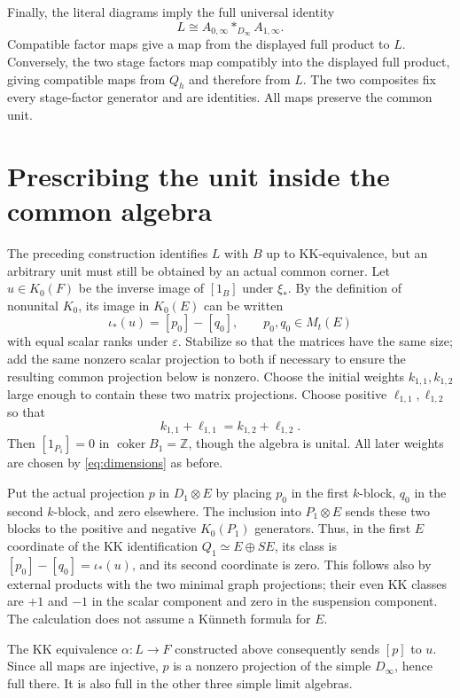 \documentclass[11pt]{article}
\theoremstyle{remark}\newtheorem{remark}[theorem]{Remark}
\newcommand{\Z}{\mathbb Z}\newcommand{\C}{\mathbb C}
\newcommand{\coker}{\operatorname{coker}}\newcommand{\rank}{\operatorname{rank}}
\begin{document}
Finally, the literal diagrams imply the full universal identity
\begin{equation}\label{eq:fulllimit}
             L\cong A_{0,\infty}*_{D_\infty}A_{1,\infty}.
\end{equation}
Compatible factor maps give a map from the displayed full product to
$L$. Conversely, the two stage factors map compatibly into the displayed
full product, giving compatible maps from $Q_h$ and therefore from $L$.
The two composites fix every stage-factor generator and are identities.
All maps preserve the common unit.

\section{Prescribing the unit inside the common algebra}
The preceding construction identifies $L$ with $B$ up to KK-equivalence,
but an arbitrary unit must still be obtained by an actual common corner.
Let $u\in K_0(F)$ be the inverse image of $[1_B]$ under $\xi_*$.
By the definition of nonunital $K_0$, its image in $K_0(E)$ can be written
\[
                  \iota_*(u)=[p_0]-[q_0],\qquad p_0,q_0\in M_t(E)
\]
with equal scalar ranks under $\varepsilon$. Stabilize so that the
matrices have the same size; add the same nonzero scalar projection to
both if necessary to ensure the resulting common projection below is
nonzero. Choose the initial weights $k_{1,1},k_{1,2}$ large enough to
contain these two matrix projections. Choose positive $\ell_{1,1},\ell_{1,2}$
so that
\[
                   k_{1,1}+\ell_{1,1}=k_{1,2}+\ell_{1,2}.
\]
Then $[1_{P_1}]=0$ in $\coker B_1=\Z$, though the algebra is unital.
All later weights are chosen by \eqref{eq:dimensions} as before.

Put the actual projection $p$ in $D_1\otimes E$ by placing $p_0$ in the
first $k$-block, $q_0$ in the second $k$-block, and zero elsewhere.
The inclusion into $P_1\otimes E$ sends these two blocks to the positive
and negative $K_0(P_1)$ generators. Thus, in the first $E$ coordinate
of the KK identification $Q_1\simeq E\oplus SE$, its class is
$[p_0]-[q_0]=\iota_*(u)$, and its second coordinate is zero. This follows
also by external products with the two minimal graph projections; their
even KK classes are $+1$ and $-1$ in the scalar component and zero in
the suspension component. The calculation does not assume a K\"unneth
formula for $E$.

The KK equivalence $\alpha:L\to F$ constructed above consequently sends
$[p]$ to $u$. Since all maps are injective, $p$ is a nonzero projection
of the simple $D_\infty$, hence full there. It is also full in the other
three simple limit algebras.
\end{document}
